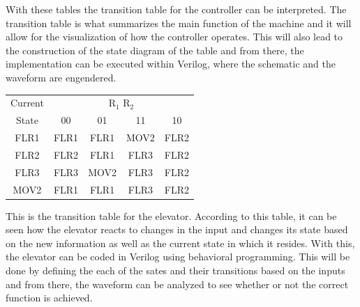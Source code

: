 \documentclass[12pt]{article}
\begin{document}
    \par With these tables the transition table for the controller can be
    interpreted. The transition table is what summarizes the main function of
    the machine and it will allow for the visualization of how the controller
    operates. This will also lead to the construction of the state diagram of
    the table and from there, the implementation can be executed within Verilog,
    where the schematic and the waveform are engendered.
    \begin{table}[h]
        \centering
        \begin{tabular}{c|cccc}
            \toprule
            Current & \multicolumn{4}{c}{R$_1$ R$_2$} \\
            State & 00 & 01 & 11 & 10 \\
            \midrule
            FLR1 & FLR1 & FLR1 & MOV2 & FLR2 \\
            FLR2 & FLR2 & FLR1 & FLR3 & FLR2 \\
            FLR3 & FLR3 & MOV2 & FLR3 & FLR2 \\
            MOV2 & FLR1 & FLR1 & FLR3 & FLR2 \\
            \bottomrule
        \end{tabular}
    \end{table}
    \par This is the transition table for the elevator. According to this table,
    it can be seen how the elevator reacts to changes in the input and changes
    its state based on the new information as well as the current state in which
    it resides. With this, the elevator can be coded in Verilog using behavioral
    programming. This will be done by defining the each of the sates and their
    transitions based on the inputs and from there, the waveform can be analyzed
    to see whether or not the correct function is achieved.
\end{document}
